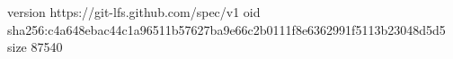 version https://git-lfs.github.com/spec/v1
oid sha256:c4a648ebac44c1a96511b57627ba9e66c2b0111f8e6362991f5113b23048d5d5
size 87540

